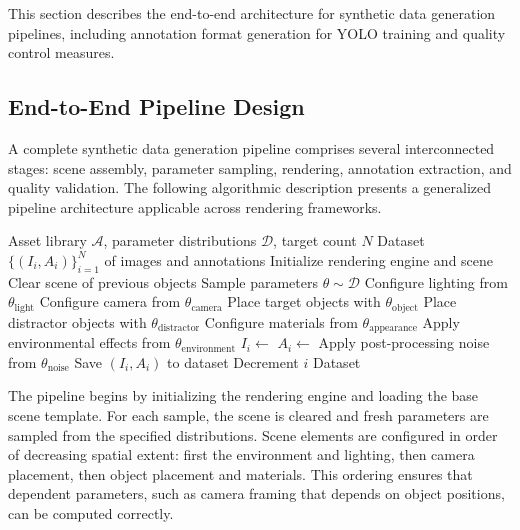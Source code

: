 This section describes the end-to-end architecture for synthetic data generation pipelines, including annotation format generation for YOLO training and quality control measures.

\subsection{End-to-End Pipeline Design}

A complete synthetic data generation pipeline comprises several interconnected stages: scene assembly, parameter sampling, rendering, annotation extraction, and quality validation. The following algorithmic description presents a generalized pipeline architecture applicable across rendering frameworks.

\begin{algorithm}
\caption{Synthetic Data Generation Pipeline}
\label{alg:sdg_pipeline}
\begin{algorithmic}[1]
\Require Asset library $\mathcal{A}$, parameter distributions $\mathcal{D}$, target count $N$
\Ensure Dataset $\{(I_i, A_i)\}_{i=1}^N$ of images and annotations
\State Initialize rendering engine and scene
    \State Clear scene of previous objects
    \State Sample parameters $\theta \sim \mathcal{D}$ 
    \State Configure lighting from $\theta_{\text{light}}$
    \State Configure camera from $\theta_{\text{camera}}$
    \State Place target objects with $\theta_{\text{object}}$
    \State Place distractor objects with $\theta_{\text{distractor}}$
    \State Configure materials from $\theta_{\text{appearance}}$
    \State Apply environmental effects from $\theta_{\text{environment}}$
    \State $I_i \gets$ 
    \State $A_i \gets$ 
    \State Apply post-processing noise from $\theta_{\text{noise}}$
        \State Save $(I_i, A_i)$ to dataset
    \Else
        \State Decrement $i$ 
    \EndIf
\EndFor
\State \Return Dataset
\end{algorithmic}
\end{algorithm}

The pipeline begins by initializing the rendering engine and loading the base scene template. For each sample, the scene is cleared and fresh parameters are sampled from the specified distributions. Scene elements are configured in order of decreasing spatial extent: first the environment and lighting, then camera placement, then object placement and materials. This ordering ensures that dependent parameters, such as camera framing that depends on object positions, can be computed correctly.

